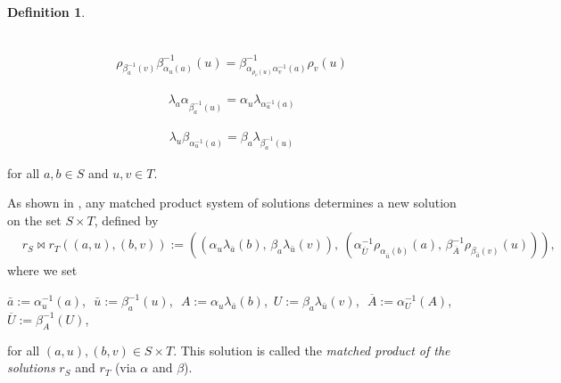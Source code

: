 \documentclass[preprint,1p]{elsarticle}
\theoremstyle{definition}               %
\newtheorem{defin}[theor]{Definition}
\newcommand{\rhoo}[2]{\rho_{#1}{#2}}
\newcommand{\lambdaa}[2]{\lambda_{#1}{#2}}
\newcommand{\alphaa}[3]{\alpha^{#1}_{#2}{#3}}
\newcommand{\betaa}[3]{\beta^{#1}_{#2}{#3}}
\begin{document}
\begin{defin}
{\begin{center}
\begin{minipage}[b]{.5\textwidth}
\begin{align}
				\end{align}
			\end{minipage}%
			\hfill\hfill
			\begin{minipage}[b]{.5\textwidth}
				\vspace{-\baselineskip}
				\begin{align}\label{eq:sesto}\tag{s4}
					\rho_{\beta^{-1}_a\!\left(v\right)}\beta^{-1}_{\alpha_u\left(a\right)}\left(u\right) = \beta^{-1}_{\alpha_{\rho_v\left(u\right)}\alpha^{-1}_v\left(a\right)}\rho_v\left(u\right)
				\end{align}
			\end{minipage}
		\end{center}
		\begin{center}
			\begin{minipage}[b]{.5\textwidth}
				\vspace{-\baselineskip}
				\begin{align}\label{eq:terzo}\tag{s5}
					\lambda_a\alphaa{}{\beta^{-1}_{a}\left(u\right)}{}= \alphaa{}{u}{\lambdaa{\alphaa{-1}{u}{\left(a\right)}}{}}
				\end{align}
			\end{minipage}%
			\hfill\hfill
			\begin{minipage}[b]{.5\textwidth}
				\vspace{-\baselineskip}
				\begin{align}\label{eq:quarto}\tag{s6}
					\lambdaa{u}{\betaa{}{\alphaa{-1}{u}{\left(a\right)}}{}}=\betaa{}{a}{\lambdaa{\beta^{-1}_{a}\left(u\right)}{}}
				\end{align}
			\end{minipage}
		\end{center}
	}
	\noindent for all $a,b \in S$ and $u,v \in T$.
    \end{defin}
    

As shown in \cite[Theorem 2]{CCoSt20}, any matched product system of solutions determines a new solution on the set $S\times T$, defined by
		\begin{align}\label{matchsolu}
			& r_S\bowtie r_T\left(\left(a, u\right), 
			\left(b, v\right)\right) := 
			\left(\left(\alphaa{}{u}{\lambdaa{\bar{a}}{\left(b\right)}},\, \beta_a\lambdaa{\bar{u}}{\left(v\right)}\right),\ \left(\alphaa{-1}{\overline{U}}{\rhoo{\alphaa{}{\bar{u}}{\left(b\right)}}{\left(a\right)}},\,  \beta^{-1}_{\overline{A}}\rhoo{\beta_{\bar{a}}\left(v\right)}{\left(u\right)}\right) \right),
		\end{align}	
		\noindent where we set
		\begin{center}
		   $\bar{a}:=\alphaa{-1}{u}{\left(a\right)}$, \,\,$\bar{u}:= \beta^{-1}_{a}\left(u\right)$,\,\, $A:=\alphaa{}{u}{\lambdaa{\bar{a}}{\left(b\right)}}$,\, $U:=\beta_a\lambdaa{\bar{u}}{\left(v\right)}$,\,\, $\overline{A}:=\alphaa{-1}{U}{\left(A\right)}$,\,\, $\overline{U}:= \beta^{-1}_{A}\left(U\right)$,
		\end{center}
		for all $\left(a,u\right),\left(b,v\right)\in S\times T$. 
		This solution is called the \emph{matched product of the solutions} $r_S$ and $r_T$ (via $\alpha$ and $\beta$).
\end{document}

